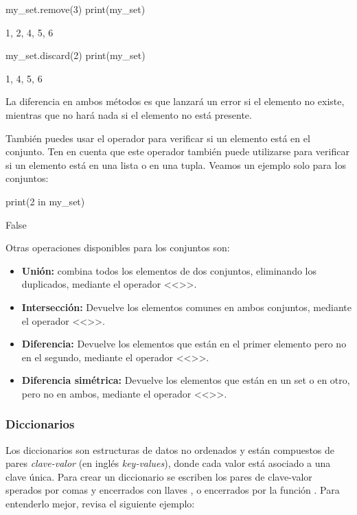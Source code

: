 \begin{pyin}
my_set.remove(3) 
print(my_set) 
\end{pyin}
\begin{pyprint}
{1, 2, 4, 5, 6}
\end{pyprint}

\begin{pyin}
my_set.discard(2)
print(my_set) 
\end{pyin}
\begin{pyprint}
{1, 4, 5, 6}
\end{pyprint}
La diferencia en ambos métodos es que  lanzará un error si el elemento no existe, mientras que  no hará nada si el elemento no está presente.

También puedes usar el operador  para verificar si un elemento está en el conjunto. Ten en cuenta que este operador también puede utilizarse para verificar si un elemento está en una lista o en una tupla. Veamos un ejemplo solo para los conjuntos:

\begin{pyin}
print(2 in my_set)
\end{pyin}
\begin{pyprint}
False
\end{pyprint}

Otras operaciones disponibles para los conjuntos son:
\begin{itemize}
    \item \textbf{Unión:} combina todos los elementos de dos conjuntos, eliminando los duplicados, mediante el operador <<\pynorm{|}>>.
    \item \textbf{Intersección:} Devuelve los elementos comunes en ambos conjuntos, mediante el operador <<\pynorm{&}>>.
    \item \textbf{Diferencia:} Devuelve los elementos que están en el primer elemento pero no en el segundo, mediante el operador <<\pynorm{-}>>.
    \item \textbf{Diferencia simétrica:} Devuelve los elementos que están en un set o en otro, pero no en ambos, mediante el operador <<\pynorm{^}>>.
\end{itemize}

\subsubsection{Diccionarios}
Los diccionarios son estructuras de datos no ordenados y están compuestos de pares \emph{clave-valor} (en inglés \emph{key-values}), donde cada valor está asociado a una clave única. Para crear un diccionario se escriben los pares de clave-valor sperados por comas y encerrados con llaves \pynorm{{}}, o encerrados por la función . Para entenderlo mejor, revisa el siguiente ejemplo:

